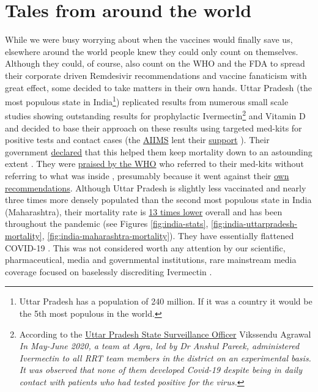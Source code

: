 \documentclass[11pt,a4paper,notitlepage]{report}
\begin{document}
\section*{Tales from around the world}

While we were busy worrying about when the vaccines would finally save us, elsewhere around the world people knew they could only count on themselves. Although they could, of course, also count on the WHO and the FDA to spread their corporate driven Remdesivir recommendations and vaccine fanaticism with great effect, some decided to take matters in their own hands. Uttar Pradesh (the most populous state in India\footnote{Uttar Pradesh has a population of 240 million. If it was a country it would be the 5th most populous in the world.}) replicated results from numerous small scale studies showing outstanding results for prophylactic Ivermectin\footnote{According to the \href{https://indianexpress.com/article/cities/lucknow/uttar-pradesh-government-says-ivermectin-helped-to-keep-deaths-low-7311786/}{Uttar Pradesh State Surveillance Officer} Vikssendu Agrawal \cite{indianexpress12052021} \textit{In May-June 2020, a team at Agra, led by Dr Anshul Pareek, administered Ivermectin to all RRT team members in the district on an experimental basis. It was observed that none of them developed Covid-19 despite being in daily contact with patients who had tested positive for the virus.}} and Vitamin D and decided to base their approach on these results using targeted med-kits for positive tests and contact cases (the \href{https://www.aiims.edu/en.html}{AIIMS} lent their \href{https://www.cureus.com/articles/64807-prophylactic-role-of-ivermectin-in-severe-acute-respiratory-syndrome-coronavirus-2-infection-among-healthcare-workers}{support} \cite{Behera2021-qu}). Their government \href{https://indianexpress.com/article/cities/lucknow/uttar-pradesh-government-says-ivermectin-helped-to-keep-deaths-low-7311786/}{declared} that this helped them keep mortality down to an astounding extent \cite{indianexpress12052021}. They were \href{https://www.who.int/india/news/feature-stories/detail/uttar-pradesh-going-the-last-mile-to-stop-covid-19}{praised by the WHO} \cite{who07052021} who referred to their med-kits without referring to what was inside \cite{medicalupdateonline21052021} \cite{hindu14092020}, presumably because it went against their \href{https://www.who.int/news-room/feature-stories/detail/who-advises-that-ivermectin-only-be-used-to-treat-covid-19-within-clinical-trials}{own recommendations}. Although Uttar Pradesh is slightly less vaccinated and nearly three times more densely populated than the second most populous state in India (Maharashtra), their mortality rate is \hyperref[fig:india-stats]{13 times lower} overall and has been throughout the pandemic (see Figures \ref{fig:india-stats}, \ref{fig:india-uttarpradesh-mortality}, \ref{fig:india-maharashtra-mortality}). They have essentially flattened COVID-19 \cite{hindustantimes19092021}. This was not considered worth any attention by our scientific, pharmaceutical, media and governmental institutions, rare mainstream media coverage focused on baselessly discrediting Ivermectin \cite{torontoStar28012022}.
\end{document}
